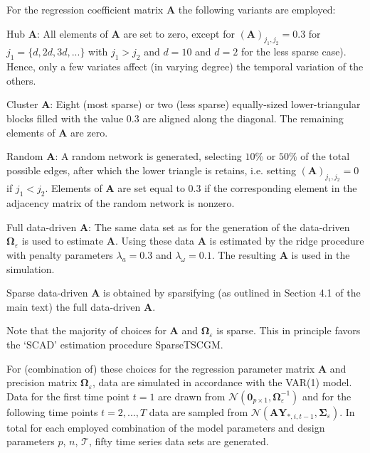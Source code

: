 \noindent
For the regression coefficient matrix $\mathbf{A}$ the following variants are employed:
\begin{compactitem}
\item Hub $\mathbf{A}$: All elements of $\mathbf{A}$ are set to zero, except for $(\mathbf{A})_{j_1, j_2}=0.3$ for $j_1=\{d,2d,3d,...\}$ with $j_1>j_2$ and $d=10$ and $d=2$ for the less sparse case). Hence, only a few variates affect (in varying degree) the temporal variation of the others.

\item Cluster $\mathbf{A}$: Eight (most sparse)  or two (less sparse) equally-sized lower-triangular blocks filled with the value 0.3 are aligned along the diagonal. The remaining elements of $\mathbf{A}$ are zero.

\item Random $\mathbf{A}$: A random network is generated, selecting $10\%$  or $50\%$ of the total possible edges, after which the lower triangle is retains, i.e. setting $(\mathbf{A})_{j_1, j_2}=0$ if $j_1<j_2$. Elements of $\mathbf{A}$ are set equal to $0.3$ if the corresponding element in the adjacency matrix of the random network is nonzero.

\item Full data-driven $\mathbf{A}$: The same data set as for the generation of the data-driven $\mathbf{\Omega}_{\varepsilon}$ is used to estimate $\mathbf{A}$. Using these data $\mathbf{A}$ is estimated by the ridge procedure with penalty parameters $\lambda_a=0.3$ and $\lambda_{\omega}=0.1$. The resulting $\mathbf{A}$ is used in the simulation.

\item Sparse data-driven $\mathbf{A}$ is obtained by sparsifying (as outlined in Section 4.1 of the main text) the full data-driven $\mathbf{A}$.
\end{compactitem}
Note that the majority of choices for $\mathbf{A}$ and $\mathbf{\Omega}_{\varepsilon}$ is sparse. This in principle favors the `SCAD' estimation procedure SparseTSCGM.

For (combination of) these choices for the regression parameter matrix $\mathbf{A}$ and precision matrix $\mathbf{\Omega}_{\varepsilon}$, data are simulated in accordance with the VAR(1) model. Data for the first time point $t=1$ are drawn from $\mathcal{N}(\mathbf{0}_{p \times 1}, \mathbf{\Omega}_{\varepsilon}^{-1})$ and for the following time points $t=2,...,T$ data are sampled from $\mathcal{N}(\mathbf{A}\mathbf{Y}_{*,i,t-1},\mathbf{\Sigma}_{\varepsilon})$. In total for each employed combination of the model parameters and design parameters $p$, $n$, $\mathcal{T}$, fifty time series data sets are generated.

